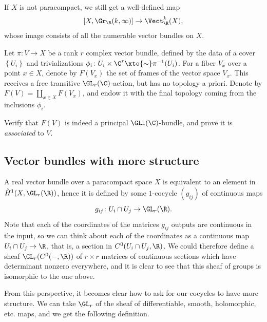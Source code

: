 \documentclass[11pt]{amsart}
\begin{document}
\begin{remark} If $X$ is not paracompact, we still get a well-defined map
\begin{align*}
    \left[ X,\Gr_\R(k,\infty) \right] \to \Vect_\R^k(X),
\end{align*}
whose image consists of all the numerable vector bundles on $X$.
\end{remark}


\begin{definition}\label{def:frame-bundle}
Let $\pi \colon V \to X$ be a rank $r$ complex vector bundle, defined by the data of a cover $\left\{ U_i \right\}$ and trivializations $\phi_i \colon U_i \times \C^r \xto{\sim} \pi^{-1}(U_i)$. For a fiber $V_x$ over a point $x\in X$, denote by $F(V_x)$ the set of frames of the vector space $V_x$. This receives a free transitive $\GL_r(\C)$-action, but has no topology a priori. Denote by $F(V) = \amalg_{x\in X}F(V_x)$, and endow it with the final topology coming from the inclusions $\phi_i$.
\end{definition}

\begin{exercise} Verify that $F(V)$ is indeed a principal $\GL_r(\C)$-bundle, and prove it is \emph{associated} to $V$.
\end{exercise}


\subsection{Vector bundles with more structure}

A real vector bundle over a paracompact space $X$ is equivalent to an element in $\check{H}^1(X,\GL_r(\R))$, hence it is defined by some $1$-cocycle $(g_{ij})$ of continuous maps
\begin{align*}
    g_{ij} \colon U_i \cap U_j \to \GL_r(\R).
\end{align*}
Note that each of the coordinates of the matrices $g_{ij}$ outputs are continuous in the input, so we can think about each of the coordinates as a continuous map $U_i \cap U_j \to \R$, that is, a section in $C^0(U_i\cap U_j, \R)$. We could therefore define a sheaf $\GL_r(C^0(-,\R))$ of $r \times r$ matrices of continuous sections which have determinant nonzero everywhere, and it is clear to see that this sheaf of groups is isomorphic to the one above.

From this perspective, it becomes clear how to ask for our cocycles to have more structure. We can take $\GL_r$ of the sheaf of differentiable, smooth, holomorphic, etc. maps, and we get the following definition.
\end{document}
